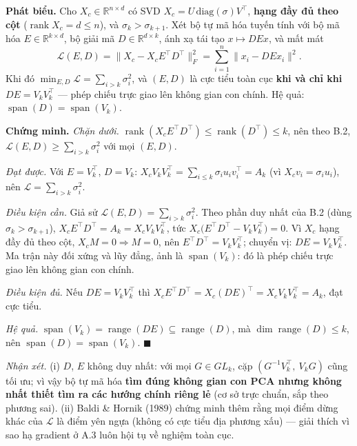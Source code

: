 \textbf{Phát biểu.} Cho \(X_c\in\mathbb R^{n\times d}\) có SVD \(X_c=U\,\mathrm{diag}(\sigma)V^\top\), \textbf{hạng đầy đủ theo cột} (\(\operatorname{rank}X_c=d\le n\)), và \(\sigma_k>\sigma_{k+1}\). Xét bộ tự mã hóa tuyến tính với bộ mã hóa \(E\in\mathbb R^{k\times d}\), bộ giải mã \(D\in\mathbb R^{d\times k}\), ánh xạ tái tạo \(x\mapsto DEx\), và mất mát \[\mathcal L(E,D)=\|X_c-X_cE^\top D^\top\|_F^2=\sum_{i=1}^n\|x_i-DEx_i\|^2 .\] Khi đó \(\min_{E,D}\mathcal L=\sum_{i>k}\sigma_i^2\), và \((E,D)\) là cực tiểu toàn cục \textbf{khi và chỉ khi} \(DE=V_kV_k^\top\) --- phép chiếu trực giao lên không gian con chính. Hệ quả: \(\operatorname{span}(D)=\operatorname{span}(V_k)\).

\textbf{Chứng minh.} \emph{Chặn dưới.} \(\operatorname{rank}(X_cE^\top D^\top)\le\operatorname{rank}(D^\top)\le k\), nên theo B.2, \(\mathcal L(E,D)\ge\sum_{i>k}\sigma_i^2\) với mọi \((E,D)\).

\emph{Đạt được.} Với \(E=V_k^\top\), \(D=V_k\): \(X_cV_kV_k^\top=\sum_{i\le k}\sigma_iu_iv_i^\top=A_k\) (vì \(X_cv_i=\sigma_iu_i\)), nên \(\mathcal L=\sum_{i>k}\sigma_i^2\).

\emph{Điều kiện cần.} Giả sử \(\mathcal L(E,D)=\sum_{i>k}\sigma_i^2\). Theo phần duy nhất của B.2 (dùng \(\sigma_k>\sigma_{k+1}\)), \(X_cE^\top D^\top=A_k=X_cV_kV_k^\top\), tức \(X_c\big(E^\top D^\top-V_kV_k^\top\big)=0\). Vì \(X_c\) hạng đầy đủ theo cột, \(X_cM=0\Rightarrow M=0\), nên \(E^\top D^\top=V_kV_k^\top\); chuyển vị: \(DE=V_kV_k^\top\). Ma trận này đối xứng và lũy đẳng, ảnh là \(\operatorname{span}(V_k)\): đó là phép chiếu trực giao lên không gian con chính.

\emph{Điều kiện đủ.} Nếu \(DE=V_kV_k^\top\) thì \(X_cE^\top D^\top=X_c(DE)^\top=X_cV_kV_k^\top=A_k\), đạt cực tiểu.

\emph{Hệ quả.} \(\operatorname{span}(V_k)=\operatorname{range}(DE)\subseteq\operatorname{range}(D)\), mà \(\dim\operatorname{range}(D)\le k\), nên \(\operatorname{span}(D)=\operatorname{span}(V_k)\). \(\blacksquare\)

\emph{Nhận xét.} (i) \(D\), \(E\) không duy nhất: với mọi \(G\in GL_k\), cặp \((G^{-1}V_k^\top,\ V_kG)\) cũng tối ưu; vì vậy bộ tự mã hóa \textbf{tìm đúng không gian con PCA nhưng không nhất thiết tìm ra các hướng chính riêng lẻ} (cơ sở trực chuẩn, sắp theo phương sai). (ii) Baldi \& Hornik (1989) chứng minh thêm rằng mọi điểm dừng khác của \(\mathcal L\) là điểm yên ngựa (không có cực tiểu địa phương xấu) --- giải thích vì sao hạ gradient ở A.3 luôn hội tụ về nghiệm toàn cục.
